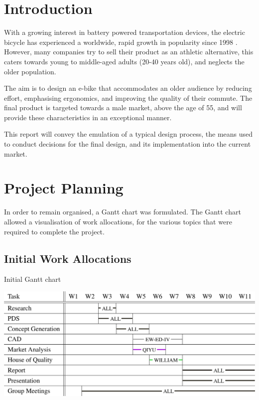 \documentclass[a4paper,11pt]{article}
\begin{document}
\pagebreak

\begingroup
\onehalfspacing
\tableofcontents
\endgroup

\pagebreak

\listoftables
{}

\pagebreak

\listoffigures
{}

\pagebreak


\section{Introduction}

With a growing interest in battery powered transportation devices, the electric bicycle has experienced a worldwide, rapid growth in popularity since 1998 \cite{wein07}. However, many companies try to sell their product as an athletic alternative, this caters towards young to middle-aged adults (20-40 years old), and neglects the older population. 

The aim is to design an e-bike that accommodates an older audience by reducing effort, emphasising ergonomics, and improving the quality of their commute. The final product is targeted towards a male market, above the age of 55, and will provide these characteristics in an exceptional manner.

This report will convey the emulation of a typical design process, the means used to conduct decisions for the final design, and its implementation into the current market.

\section{Project Planning}

In order to remain organised, a Gantt chart was formulated. The Gantt chart allowed a visualisation of work allocations, for the various topics that were required to complete the project. 

\subsection{Initial Work Allocations}

\begin{table}[!ht]
	\centering
	\caption{Initial Gantt chart}
	\includegraphics[width=1\textwidth]{gti}
\end{table}
\end{document}
